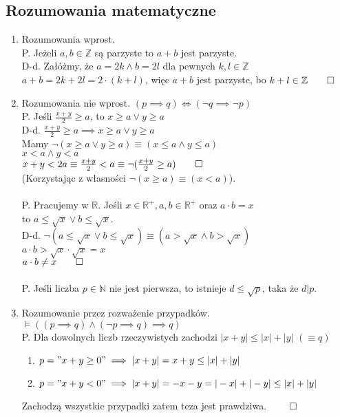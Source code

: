 \documentclass{article}
\theoremstyle{definition}
\theoremstyle{definition}
\theoremstyle{definition}
\theoremstyle{definition}
\begin{document}
\subsection{Rozumowania matematyczne}
\begin{enumerate}
    \item Rozumowania wprost.\\
    P. Jeżeli $a,b\in \mathbb{Z}$ są parzyste to $a+b$ jest parzyste.\\
    D-d. Załóżmy, że $a=2k\land b=2l$ dla pewnych $k,l\in \mathbb{Z}$\\
    $a+b=2k+2l=2\cdot(k+l)$, więc $a+b$ jest parzyste, bo $k+l\in \mathbb{Z} \qed$
    \item Rozumowania nie wprost. $(p\implies q) \iff (\neg q\implies \neg p)$ \\
    P. Jeśli $\frac{x+y}{2}\geq a$, to $x\geq a \lor y\geq a$\\
    D-d.  $\frac{x+y}{2}\geq a \implies x\geq a \lor y\geq a$\\
    Mamy $\neg(x\geq a \lor y\geq a)\equiv (x\leq a\land y\leq a)$\\
    $x< a \land y< a$\\
    $x+y< 2a\equiv \frac{x+y}{2}< a \equiv \neg(\frac{x+y}{2}\geq a)\qed$\\
    (Korzystając z własności $\neg(x\geq a)\equiv(x< a)$).\\\\
    P. Pracujemy w $\mathbb{R}$. Jeśli $x\in \mathbb{R}^{+}, a,b\in \mathbb{R}^{+}$ oraz $a\cdot b=x$\\
    to $a\leq \sqrt{x}\lor b\leq \sqrt{x}$.\\
    D-d. $\neg(a\leq \sqrt{x}\lor b\leq \sqrt{x}) \equiv (a>\sqrt{x}\land b>\sqrt{x})$\\
    $a\cdot b > \sqrt{x}\cdot \sqrt{x} = x$\\
    $a\cdot b \neq x\qed$\\\\
    P. Jeśli liczba $p\in \mathbb{N}$ nie jest pierwsza, to istnieje $d\leq\sqrt{p}$, taka że $d|p$.
    \item Rozumowanie przez rozważenie przypadków. $\models ((p\implies q)\land(\neg p\implies q) \implies q)$\\
    P. Dla dowolnych liczb rzeczywistych zachodzi $|x+y|\leq |x| + |y|$ $(\equiv q)$\\
    \begin{enumerate}
        \item $p="x+y\geq 0" \implies |x+y|=x+y\leq |x|+|y|$
        \item $p="x+y<0" \implies |x+y|=-x-y=|-x|+|-y|\leq |x|+|y|$ 
    \end{enumerate}
    Zachodzą wszystkie przypadki zatem teza jest prawdziwa. $\qed$
\end{enumerate}
\end{document}
